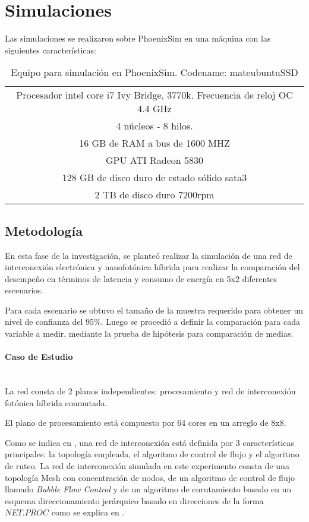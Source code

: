 \section{Simulaciones}

Las simulaciones se realizaron sobre PhoenixSim en una máquina con
las siguientes características:

\begin{table}[H]
\centering
\begin{tabular}{|c|}
\hline
Procesador intel core i7 Ivy Bridge, 3770k. Frecuencia de reloj OC 4.4 GHz \\
4 núcleos - 8 hilos. \\
16 GB de RAM a bus de 1600 MHZ \\
GPU ATI Radeon 5830 \\
128 GB  de disco duro de estado sólido sata3 \\
2 TB de disco duro 7200rpm \\
\hline
\end{tabular}
\caption{Equipo para simulación en PhoenixSim. Codename: mateubuntuSSD}
\label{tb:pcsim3}
\end{table} 

\subsection{Metodología}
En esta fase de la investigación, se planteó realizar la simulación de 
una red de interconexión electrónica y nanofotónica híbrida para 
realizar la comparación del desempeño en términos de latencia y consumo
de energía en 5x2 diferentes escenarios.

Para cada escenario se obtuvo el tamaño de la muestra requerido
para obtener un nivel de confianza del 95\%. Luego se procedió
a definir la comparación para cada variable a medir, 
mediante la prueba de hipótesis para comparación de medias. 

\paragraph{Caso de Estudio} ~\\
La red consta de 2 planos independientes: procesamiento y
red de interconexión fotónica híbrida conmutada. 

El plano de procesamiento está compuesto por 64 
cores en un arreglo de 8x8. 

Como se indica en \cite{dally2004principles}, una red de interconexión está definida
por 3 características principales: la topología empleada, el algoritmo de control de
flujo y el algoritmo de ruteo. La red de interconexión simulada en este experimento
consta de una topología Mesh con concentración de nodos, de un algoritmo de control de
flujo llamado \textit{Bubble Flow Control}\cite{puente1999adaptive}\cite{Manual} y
de un algoritmo de enrutamiento basado en un esquema direccionamiento jerárquico
basado en direcciones de la forma $NET.PROC$ como se explica en \cite{Manual}.

